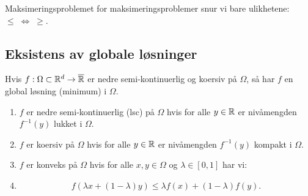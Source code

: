 \documentclass[10pt, a4paper]{article}
\begin{document}
\begin{remark}{Maksimeringsproblemet}{}
  for maksimeringsproblemer snur vi bare ulikhetene: \(\leq \; \Leftrightarrow \; \geq\).
\end{remark}

\subsection*{Eksistens av globale løsninger}

Hvis \(f: \Omega \subset \mathbb{R}^d \to \overline{\mathbb{R}}\) er nedre semi-kontinuerlig og koersiv på \(\Omega\), så har \(f\) en global løsning (minimum) i \(\Omega\).

\begin{enumerate}
  \item \(f\) er nedre semi-kontinuerlig (lsc) på \(\Omega\) hvis for alle \(y \in \mathbb{R}\) er nivåmengden \(f^{-1}(y)\) lukket i \(\Omega\).
  \item \(f\) er koersiv på \(\Omega\) hvis for alle \(y \in \mathbb{R}\) er nivåmengden \(f^{-1}(y)\) kompakt i \(\Omega\).
  \item \(f\) er konveks på \(\Omega\) hvis for alle \(x, y \in \Omega\) og \(\lambda \in [0, 1]\) har vi:
  \item
        \[
          f(\lambda x + (1 - \lambda)y) \leq \lambda f(x) + (1 - \lambda)f(y).
        \]
\end{enumerate}

\newpage
\end{document}
